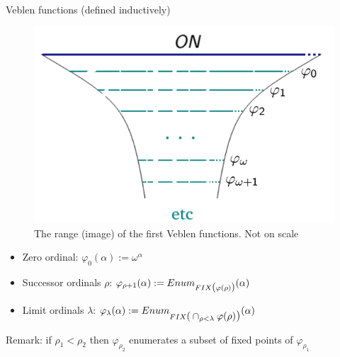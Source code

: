 \documentclass[10pt]{beamer}
\begin{document}
\begin{frame}{Veblen functions (defined inductively)}
\begin{figure}
\centering
\includegraphics[scale=0.4]{veblen.png}
\caption{The range (image) of the first Veblen functions. Not on scale}
\end{figure}

\begin{itemize}
	\item Zero ordinal: $\varphi_0(\alpha) := \omega^\alpha$
	\item Successor ordinals $\rho$: $\varphi_{\rho+1}(\alpha) := Enum_{FIX\mathlarger{(}\varphi(\rho)\mathlarger{)}} (\alpha)$
	\item Limit ordinals $\lambda$: $\varphi_{\lambda}(\alpha) := Enum_{FIX\mathlarger{(}\displaystyle\cap_{\rho < \lambda}\varphi(\rho)\mathlarger{)}}(\alpha)$
\end{itemize} \pause

Remark: if $\rho_1 < \rho_2$ then $\varphi_{\rho_2}$ enumerates a subset of fixed points of $\varphi_{\rho_1}$

\end{frame}

\end{document}
